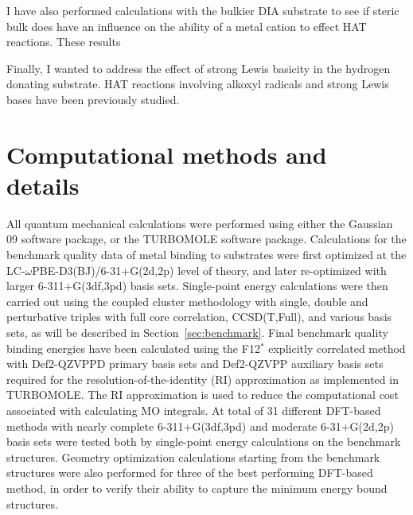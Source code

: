 I have also performed calculations with the bulkier DIA substrate to see if steric bulk does have an influence on the ability of a metal cation to effect HAT reactions.  These results

Finally, I wanted to address the effect of strong Lewis basicity in the hydrogen donating substrate. HAT reactions involving alkoxyl radicals and strong Lewis bases have been previously studied.%



\section{Computational methods and details}

All quantum mechanical calculations were performed using either the Gaussian 09 software package,\cite{Frisch2009} or the TURBOMOLE software package.\cite{turbomole} Calculations for the benchmark quality data of metal binding to substrates were first optimized at the LC-$\omega$PBE-D3(BJ)/6-31+G(2d,2p) level of theory,\cite{Vydrov2006, Vydrov2006a, Grimme2010, Johnson2006} and later re-optimized with larger 6-311+G(3df,3pd) basis sets. Single-point energy calculations were then carried out using the coupled cluster methodology with single, double and perturbative triples with full core correlation, CCSD(T,Full), and various basis sets, as will be described in Section~\ref{sec:benchmark}. Final benchmark quality binding energies have been calculated using the F12$^*$ explicitly correlated method with Def2-QZVPPD primary basis sets and Def2-QZVPP auxiliary basis sets required for the resolution-of-the-identity (RI) approximation as implemented in TURBOMOLE. The RI approximation is used to reduce the computational cost associated with calculating MO integrals. At total of 31 different DFT-based methods with nearly complete 6-311+G(3df,3pd) and moderate 6-31+G(2d,2p) basis sets were tested both by single-point energy calculations on the benchmark structures. Geometry optimization calculations starting from the benchmark structures were also performed for three of the best performing DFT-based method, in order to verify their ability to capture the minimum energy bound structures.

